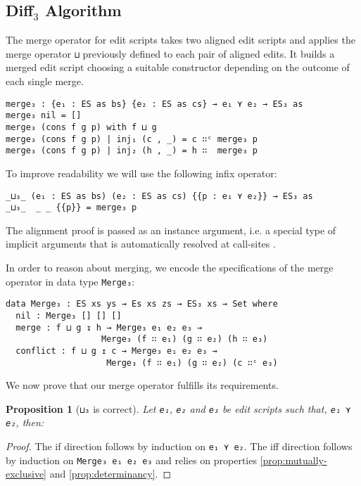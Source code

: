 \documentclass{sigplanconf}
\theoremstyle{plain}
\newtheorem{prop}{Proposition}
\begin{document}
        \subsection{Diff$_3$ Algorithm}
        \label{subsec:diff3-algo}

	The merge operator for edit scripts takes two aligned edit scripts and
	applies the merge operator \texttt{⊔} previously defined to
	each pair of aligned edits. It builds a merged edit script choosing a 
	suitable constructor depending on the outcome of each single merge.
\begin{verbatim}
merge₃ : {e₁ : ES as bs} {e₂ : ES as cs} → e₁ ⋎ e₂ → ES₃ as
merge₃ nil = []
merge₃ (cons f g p) with f ⊔ g
merge₃ (cons f g p) | inj₁ (c , _) = c ∷ᶜ merge₃ p
merge₃ (cons f g p) | inj₂ (h , _) = h ∷  merge₃ p
\end{verbatim}
	To improve readability we will use the following infix
        operator:
\begin{verbatim}
_⊔₃_ (e₁ : ES as bs) (e₂ : ES as cs) {{p : e₁ ⋎ e₂}} → ES₃ as
_⊔₃_  _ _ {{p}} = merge₃ p
\end{verbatim}
	The alignment proof is passed  as an instance argument, i.e. a
        special  type  of  implicit arguments  that  is  automatically
        resolved at call-sites \cite{Devriese11}.

        In order to reason about merging, we encode the specifications
        of the merge operator in data type \texttt{Merge₃}:

{}
\begin{verbatim}
data Merge₃ : ES xs ys → Es xs zs → ES₃ xs → Set where
  nil : Merge₃ [] [] []
  merge : f ⊔ g ↧ h → Merge₃ e₁ e₂ e₃ → 
                   Merge₃ (f ∷ e₁) (g ∷ e₂) (h ∷ e₃)
  conflict : f ⊔ g ↥ c → Merge₃ e₁ e₂ e₃ → 
                    Merge₃ (f ∷ e₁) (g ∷ e₂) (c ∷ᶜ e₃)
\end{verbatim}

        We now prove that our merge operator fulfills its requirements.
\begin{prop}[\texttt{⊔₃} is correct]
\label{prop:merge3-correct}
Let \texttt{e₁}, \texttt{e₂} and \texttt{e₃} be edit scripts such that,
\texttt{e₁ ⋎ e₂}, then:
\end{prop}
\begin{proof}
The if direction follows by induction on \texttt{e₁ ⋎ e₂}.
The iff direction follows by induction on \texttt{Merge₃ e₁ e₂ e₃} and 
relies on properties \ref{prop:mutually-exclusive} and \ref{prop:determinancy}.
\end{proof}
        
\end{document}
